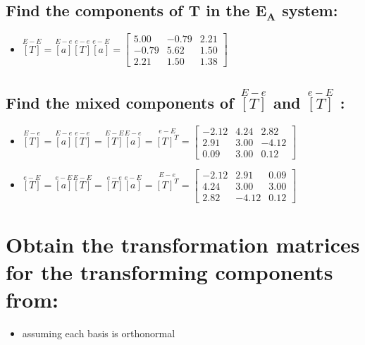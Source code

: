 \documentclass[10pt, letterpaper]{article}
\begin{document}
	\subsection{Find the components of $\bm{T}$ in the $\bm{E_A}$ system:}
		\begin{itemize}
			\item $\overset{E-E}{[T]} =  \overset{E -e}{[a]} \overset{e-e}{[T]}  \overset{e -E}{[a]} =
				\begin{bmatrix}	5.00 & -0.79 & 2.21 \\
							-0.79 & 5.62 & 1.50 \\
							2.21 & 1.50 & 1.38 
					\end{bmatrix} $
		\end{itemize}
		
	\subsection{Find the mixed components of $\overset{E-e}{[T]}$ and $\overset{e-E}{[T]}$ :}
		\begin{itemize}
			\item $\overset{E-e}{[T]} =  \overset{E -e}{[a]} \overset{e-e}{[T]} = \overset{E-E}{[T]} \overset{E -e}{[a]} =
					\overset{e-E}{[T]^T} =
				\begin{bmatrix}	-2.12 & 4.24 & 2.82 \\
							2.91 & 3.00 & -4.12 \\
							0.09 & 3.00 & 0.12 
					\end{bmatrix} $
			\item $\overset{e-E}{[T]} =  \overset{e -E}{[a]} \overset{E-E}{[T]} = \overset{e-e}{[T]} \overset{e -E}{[a]} =
					\overset{E-e}{[T]^T} =
				\begin{bmatrix}	-2.12 & 2.91 & 0.09 \\
							4.24 & 3.00 & 3.00 \\
							2.82 & -4.12 & 0.12 
					\end{bmatrix} $
		\end{itemize}
		
\section{Obtain the transformation matrices for the transforming components from:}
	\begin{itemize}
		\item assuming each basis is orthonormal
	\end{itemize}
\end{document}
